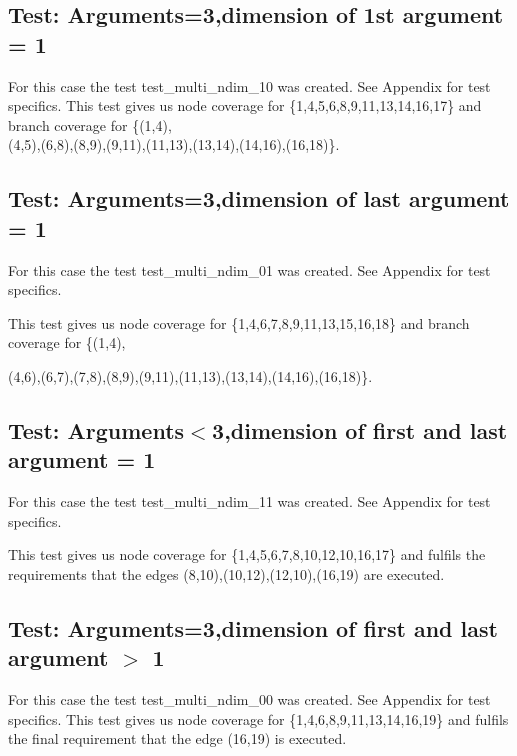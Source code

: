 \subsection{Test: Arguments=3,dimension of 1st argument = 1}

For this case the test test\_multi\_ndim\_10 was created. See Appendix for test specifics.
This test gives us node coverage for \{1,4,5,6,8,9,11,13,14,16,17\} and branch coverage for \{(1,4),
\\
(4,5),(6,8),(8,9),(9,11),(11,13),(13,14),(14,16),(16,18)\}.




\subsection{Test: Arguments=3,dimension of last argument = 1}

For this case the test test\_multi\_ndim\_01 was created. See Appendix for test specifics.

This test gives us node coverage for \{1,4,6,7,8,9,11,13,15,16,18\} and branch coverage for \{(1,4),

(4,6),(6,7),(7,8),(8,9),(9,11),(11,13),(13,14),(14,16),(16,18)\}.



\subsection{Test: Arguments$<$3,dimension of first and last argument = 1}

For this case the test test\_multi\_ndim\_11 was created. See Appendix for test specifics.

This test gives us node coverage for \{1,4,5,6,7,8,10,12,10,16,17\} and fulfils the requirements that the edges {(8,10),(10,12),(12,10),(16,19)} are executed.


\subsection{Test: Arguments=3,dimension of first and last argument $>$ 1}


For this case the test test\_multi\_ndim\_00 was created. See Appendix for test specifics.
This test gives us node coverage for \{1,4,6,8,9,11,13,14,16,19\} and fulfils the final requirement that the edge (16,19) is executed.


